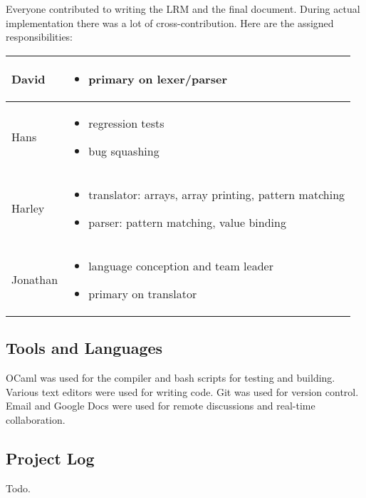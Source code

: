 Everyone contributed to writing the LRM and the final document. During  actual implementation there was a lot of cross-contribution. Here are the assigned responsibilities:
\begin{center}
\begin{tabular}{ | l | p{10cm} |}
\hline
David & \begin{itemize}
			\item primary on lexer/parser
		\end{itemize} \\ 
\hline
Hans & \begin{itemize}
			\item regression tests
			\item bug squashing
	   \end{itemize} \\
\hline
Harley & \begin{itemize}
			\item translator: arrays, array printing, pattern matching
			\item parser: pattern matching, value binding
		 \end{itemize} \\
\hline
Jonathan & \begin{itemize}
			\item language conception and team leader 
			\item primary on translator	 
		   \end{itemize}  \\
\hline
\end{tabular}
\end{center}

\subsection{Tools and Languages}
OCaml was used for the compiler and bash scripts for testing and building. Various text editors were used for writing code. Git was used for version control. Email and Google Docs were used for remote discussions and real-time collaboration.

\subsection{Project Log}
Todo.\\
